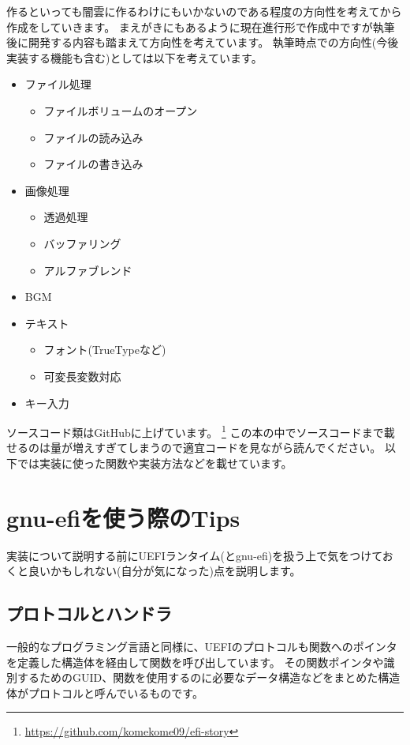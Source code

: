 \documentclass[10pt,b5paper,twoside,openany]{ltjsbook}
\begin{document}
作るといっても闇雲に作るわけにもいかないのである程度の方向性を考えてから作成をしていきます。
まえがきにもあるように現在進行形で作成中ですが執筆後に開発する内容も踏まえて方向性を考えています。
執筆時点での方向性(今後実装する機能も含む)としては以下を考えています。
\begin{multicols}{2}
    \centering
    \begin{itemize}
        \item ファイル処理
        \begin{itemize}
            \item ファイルボリュームのオープン
            \item ファイルの読み込み
            \item ファイルの書き込み
        \end{itemize}
        \item 画像処理
        \begin{itemize}
            \item 透過処理
            \item バッファリング
            \item アルファブレンド
        \end{itemize}
        \columnbreak
        \item BGM
        \item テキスト
        \begin{itemize}
            \item フォント(TrueTypeなど)
            \item 可変長変数対応
        \end{itemize}
        \item キー入力
    \end{itemize}
\end{multicols}
ソースコード類はGitHubに上げています。
\footnote{\url{https://github.com/komekome09/efi-story}}
この本の中でソースコードまで載せるのは量が増えすぎてしまうので適宜コードを見ながら読んでください。
以下では実装に使った関数や実装方法などを載せています。

\section{gnu-efiを使う際のTips}
実装について説明する前にUEFIランタイム(とgnu-efi)を扱う上で気をつけておくと良いかもしれない(自分が気になった)点を説明します。
\subsection{プロトコルとハンドラ}
一般的なプログラミング言語と同様に、UEFIのプロトコルも関数へのポインタを定義した構造体を経由して関数を呼び出しています。
その関数ポインタや識別するためのGUID、関数を使用するのに必要なデータ構造などをまとめた構造体がプロトコルと呼んでいるものです。
\end{document}
